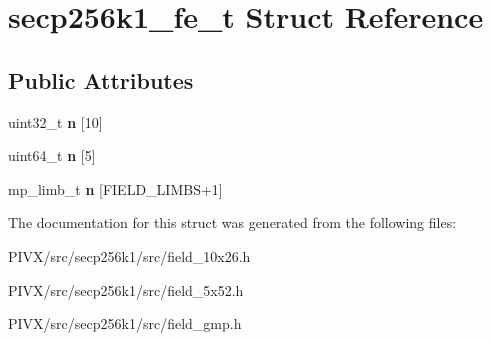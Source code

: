 \hypertarget{structsecp256k1__fe__t}{}\section{secp256k1\+\_\+fe\+\_\+t Struct Reference}
\label{structsecp256k1__fe__t}
\subsection*{Public Attributes}
\begin{DoxyCompactItemize}
\item 
\mbox{\label{structsecp256k1__fe__t_a998e2427a7ee5c6a6842cae3fd9d158b}} 
uint32\+\_\+t {\bfseries n} \mbox{[}10\mbox{]}
\item 
\mbox{\label{structsecp256k1__fe__t_a619a2a961744b3517b6bd9c672667413}} 
uint64\+\_\+t {\bfseries n} \mbox{[}5\mbox{]}
\item 
\mbox{\label{structsecp256k1__fe__t_aa5eb5b775f108fd2ebd22b0162813e83}} 
mp\+\_\+limb\+\_\+t {\bfseries n} \mbox{[}F\+I\+E\+L\+D\+\_\+\+L\+I\+M\+BS+1\mbox{]}
\end{DoxyCompactItemize}


The documentation for this struct was generated from the following files\+:\begin{DoxyCompactItemize}
\item 
P\+I\+V\+X/src/secp256k1/src/field\+\_\+10x26.\+h\item 
P\+I\+V\+X/src/secp256k1/src/field\+\_\+5x52.\+h\item 
P\+I\+V\+X/src/secp256k1/src/field\+\_\+gmp.\+h\end{DoxyCompactItemize}
